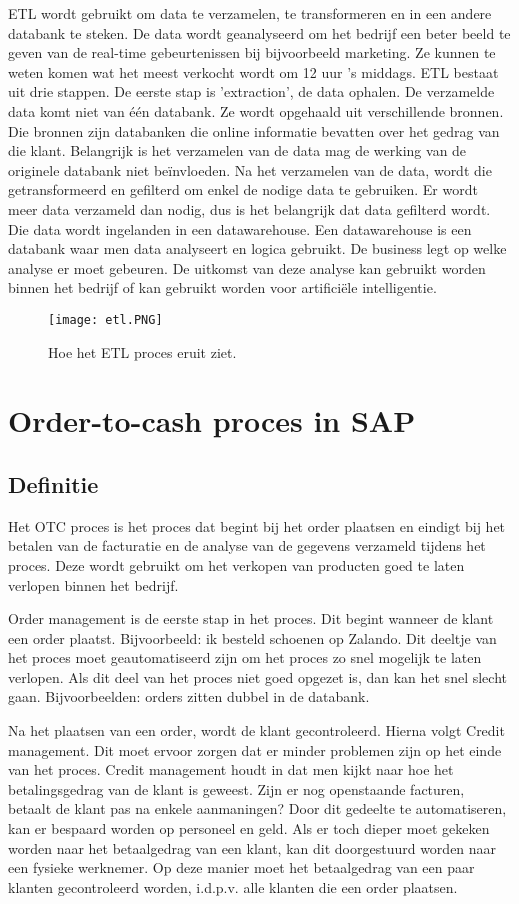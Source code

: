 ETL wordt gebruikt  om data te verzamelen, te transformeren en in een andere databank te steken. De data wordt geanalyseerd om het bedrijf een beter beeld te geven van de real-time gebeurtenissen bij bijvoorbeeld marketing. Ze kunnen te weten komen wat het meest verkocht wordt om 12 uur 's middags. 
ETL bestaat uit drie stappen.
De eerste stap is 'extraction', de data ophalen. De verzamelde data komt niet van één databank. Ze wordt opgehaald uit verschillende bronnen. Die bronnen zijn databanken die online informatie bevatten over het gedrag van die klant. Belangrijk is het verzamelen van de data mag de werking van de originele databank niet beïnvloeden.
Na het verzamelen van de data, wordt die getransformeerd en gefilterd om enkel de nodige data te gebruiken. Er wordt meer data verzameld dan nodig, dus is het belangrijk dat data gefilterd wordt.
Die data wordt ingelanden in een datawarehouse. Een datawarehouse is een databank waar men data analyseert en logica gebruikt. De business legt op welke analyse er moet gebeuren. De uitkomst van deze analyse kan gebruikt worden binnen het bedrijf of kan gebruikt worden voor artificiële intelligentie.  

\begin{figure}[h!]
	\texttt{[image: etl.PNG]}
	\centering
	\caption{Hoe het ETL proces eruit ziet. \textcite{Panolapy2019}}
\end{figure}


\section{Order-to-cash proces in SAP}
\subsection{Definitie}
Het OTC proces is het proces dat begint bij het order plaatsen en eindigt bij het betalen van de facturatie en de analyse van de gegevens verzameld tijdens het proces. Deze wordt gebruikt om het verkopen van producten goed te laten verlopen binnen het bedrijf.

Order management is de eerste stap in het proces. Dit begint wanneer de klant een order plaatst. Bijvoorbeeld: ik besteld schoenen op Zalando. Dit deeltje van het proces moet geautomatiseerd zijn om het proces zo snel mogelijk te laten verlopen. Als dit deel van het proces niet goed opgezet  is, dan kan het snel slecht gaan. Bijvoorbeelden: orders zitten dubbel in de databank.

Na het plaatsen van een order, wordt de klant gecontroleerd. Hierna volgt Credit management. Dit moet ervoor zorgen dat er minder problemen zijn op het einde van het proces. Credit management houdt in dat men kijkt naar hoe het betalingsgedrag van de klant is geweest. Zijn er nog openstaande facturen, betaalt de klant pas na enkele aanmaningen? Door dit gedeelte te automatiseren, kan er bespaard worden op personeel en geld. Als er toch dieper moet gekeken worden naar het betaalgedrag van een klant, kan dit doorgestuurd worden naar een fysieke werknemer. Op deze manier moet het betaalgedrag van een paar klanten gecontroleerd worden, i.d.p.v. alle klanten die een order plaatsen.
 
